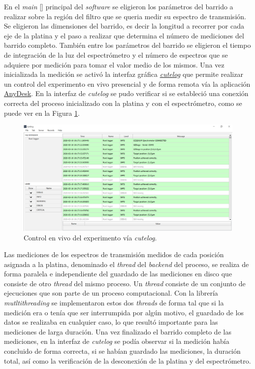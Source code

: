 En el \textit{main} [\href{https://github.com/jrr1984/open_frame_XYStage/blob/master/main.py}{\faGithub}] principal del \textit{software} se eligieron los parámetros del barrido a realizar sobre la región del filtro que se queria medir su espectro de transmisión. Se eligieron las dimensiones del barrido, es decir la longitud a recorrer por cada eje de la platina y el paso a realizar que determina el número de mediciones del barrido completo. También entre los parámetros del barrido se eligieron el tiempo de integración de la luz del espectrómetro y el número de espectros que se adquiere por medición para tomar el valor medio de los mismos. Una vez inicializada la medición se activó la interfaz gráfica \href{https://pypi.org/project/cutelog/}{\textit{cutelog}} que permite realizar un control del experimento en vivo presencial y de forma remota vía la aplicación \href{https://anydesk.com/es}{AnyDesk}. En la interfaz de \textit{cutelog} se pudo verificar si se estableció una conexión correcta del proceso inicializado con la platina y con el espectrómetro, como se puede ver en la Figura \ref{fig:init}.
 \begin{figure}[H]
	\centering
	\includegraphics[width=1.0\textwidth]{Figs/microespectrometro/cute1.png}
	\caption{Control en vivo del experimento vía \textit{cutelog}.}
	\label{fig:init}
\end{figure}

Las mediciones de los espectros de transmisión medidos de cada posición asignada a la platina, denominado el \textit{thread} del \textit{backend} del proceso, se realiza de forma paralela e independiente del guardado de las mediciones en disco que consiste de otro \textit{thread} del mismo proceso. Un \textit{thread} consiste de un conjunto de ejecuciones que son parte de un proceso computacional. Con la librería \textit{mutltithreading} se implementaron estos dos \textit{threads} de forma tal que si la medición era o tenía que ser interrumpida por algún motivo, el guardado de los datos se realizaba en cualquier caso, lo que resultó importante para las mediciones de larga duración. Una vez finalizado el barrido completo de las mediciones, en la interfaz de \textit{cutelog} se podía observar si la medición había concluido de forma correcta, si se habían guardado las mediciones, la duración total, así como la verificación de la desconexión de la platina y del espectrómetro.

